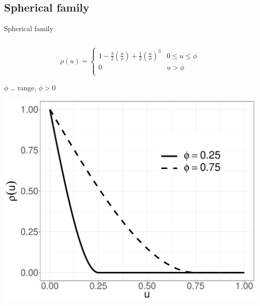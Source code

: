\documentclass[
  ignorenonframetext,
]{beamer}
\begin{document}
\hypertarget{spherical-family}{%
\subsection{Spherical family}\label{spherical-family}}

\begin{frame}{Spherical family}
\begin{columns}[T]
\begin{column}{0.5\textwidth}
\small

\[
\rho(u)= \left\{
\begin{array}{ll}
      1-\frac{3}{2}\left(\frac{u}{\phi}\right)+\frac{1}{2}\left(\frac{u}{\phi}\right)^3 & 0\leq u \leq \phi \\
      0 & u > \phi\\
\end{array} 
\right. 
\]

\(\phi\) \ldots{} range, \(\phi>0\)

\includegraphics{Lecture_1_files/figure-beamer/unnamed-chunk-44-1.pdf}
\end{column}


\end{columns}
\end{frame}
\end{document}
